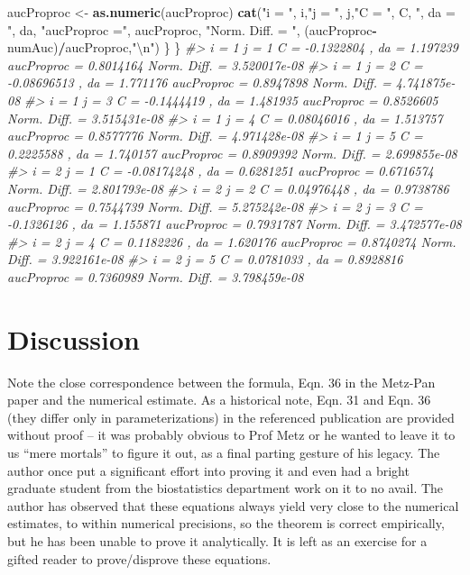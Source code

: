 \documentclass[
]{book}
\newenvironment{Shaded}{\begin{snugshade}}{\end{snugshade}}
\newcommand{\CharTok}[1]{\textcolor[rgb]{0.31,0.60,0.02}{#1}}
\newcommand{\CommentTok}[1]{\textcolor[rgb]{0.56,0.35,0.01}{\textit{#1}}}
\newcommand{\KeywordTok}[1]{\textcolor[rgb]{0.13,0.29,0.53}{\textbf{#1}}}
\newcommand{\NormalTok}[1]{#1}
\newcommand{\OperatorTok}[1]{\textcolor[rgb]{0.81,0.36,0.00}{\textbf{#1}}}
\newcommand{\StringTok}[1]{\textcolor[rgb]{0.31,0.60,0.02}{#1}}
\begin{document}
\begin{Shaded}
\begin{Highlighting}[]
\NormalTok{    aucProproc \textless{}{-}}\StringTok{  }\KeywordTok{as.numeric}\NormalTok{(aucProproc)}
    \KeywordTok{cat}\NormalTok{(}\StringTok{"i = "}\NormalTok{, i,}\StringTok{"j = "}\NormalTok{, j,}\StringTok{"C = "}\NormalTok{, C, }\StringTok{", da = "}\NormalTok{, da, }\StringTok{"aucProproc ="}\NormalTok{, aucProproc, }\StringTok{"Norm. Diff. = "}\NormalTok{, (aucProproc}\OperatorTok{{-}}\NormalTok{numAuc)}\OperatorTok{/}\NormalTok{aucProproc,}\StringTok{"}\CharTok{\textbackslash{}n}\StringTok{"}\NormalTok{)}
\NormalTok{  \}}
\NormalTok{\}}
\CommentTok{\#\textgreater{} i =  1 j =  1 C =  {-}0.1322804 , da =  1.197239 aucProproc = 0.8014164 Norm. Diff. =  3.520017e{-}08 }
\CommentTok{\#\textgreater{} i =  1 j =  2 C =  {-}0.08696513 , da =  1.771176 aucProproc = 0.8947898 Norm. Diff. =  4.741875e{-}08 }
\CommentTok{\#\textgreater{} i =  1 j =  3 C =  {-}0.1444419 , da =  1.481935 aucProproc = 0.8526605 Norm. Diff. =  3.515431e{-}08 }
\CommentTok{\#\textgreater{} i =  1 j =  4 C =  0.08046016 , da =  1.513757 aucProproc = 0.8577776 Norm. Diff. =  4.971428e{-}08 }
\CommentTok{\#\textgreater{} i =  1 j =  5 C =  0.2225588 , da =  1.740157 aucProproc = 0.8909392 Norm. Diff. =  2.699855e{-}08 }
\CommentTok{\#\textgreater{} i =  2 j =  1 C =  {-}0.08174248 , da =  0.6281251 aucProproc = 0.6716574 Norm. Diff. =  2.801793e{-}08 }
\CommentTok{\#\textgreater{} i =  2 j =  2 C =  0.04976448 , da =  0.9738786 aucProproc = 0.7544739 Norm. Diff. =  5.275242e{-}08 }
\CommentTok{\#\textgreater{} i =  2 j =  3 C =  {-}0.1326126 , da =  1.155871 aucProproc = 0.7931787 Norm. Diff. =  3.472577e{-}08 }
\CommentTok{\#\textgreater{} i =  2 j =  4 C =  0.1182226 , da =  1.620176 aucProproc = 0.8740274 Norm. Diff. =  3.922161e{-}08 }
\CommentTok{\#\textgreater{} i =  2 j =  5 C =  0.0781033 , da =  0.8928816 aucProproc = 0.7360989 Norm. Diff. =  3.798459e{-}08}
\end{Highlighting}
\end{Shaded}

\hypertarget{discussion-2}{%
\section{Discussion}\label{discussion-2}}

Note the close correspondence between the formula, Eqn. 36 in the Metz-Pan paper and the numerical estimate. As a historical note, Eqn. 31 and Eqn. 36 (they differ only in parameterizations) in the referenced publication are provided without proof -- it was probably obvious to Prof Metz or he wanted to leave it to us ``mere mortals'' to figure it out, as a final parting gesture of his legacy. The author once put a significant effort into proving it and even had a bright graduate student from the biostatistics department work on it to no avail. The author has observed that these equations always yield very close to the numerical estimates, to within numerical precisions, so the theorem is correct empirically, but he has been unable to prove it analytically. It is left as an exercise for a gifted reader to prove/disprove these equations.
\end{document}
